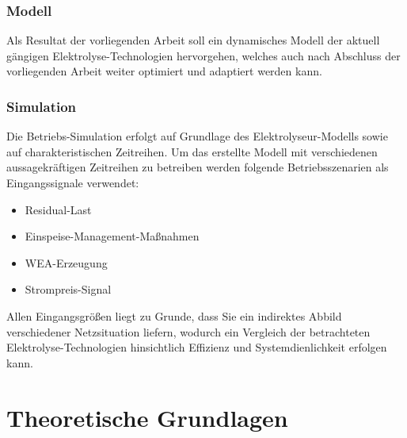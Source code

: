 \documentclass[onecolumn,10pt,titlepage]{article}
\begin{document}
\subsubsection{Modell}
Als Resultat der vorliegenden Arbeit soll ein dynamisches Modell der aktuell gängigen Elektrolyse-Technologien hervorgehen, welches auch nach Abschluss der vorliegenden Arbeit weiter optimiert und adaptiert werden kann.\\

\subsubsection{Simulation}
Die Betriebs-Simulation erfolgt auf Grundlage des Elektrolyseur-Modells sowie auf charakteristischen Zeitreihen. Um das erstellte Modell mit verschiedenen aussagekräftigen Zeitreihen zu betreiben werden folgende Betriebsszenarien als Eingangssignale verwendet:
\begin{itemize}
	\item Residual-Last
	\item Einspeise-Management-Maßnahmen
	\item WEA-Erzeugung
	\item Strompreis-Signal
\end{itemize}  
Allen Eingangsgrößen liegt zu Grunde, dass Sie ein indirektes Abbild verschiedener Netzsituation liefern, wodurch ein Vergleich der betrachteten Elektrolyse-Technologien hinsichtlich Effizienz und Systemdienlichkeit erfolgen kann.  

%	

\section{Theoretische Grundlagen}
\end{document}
